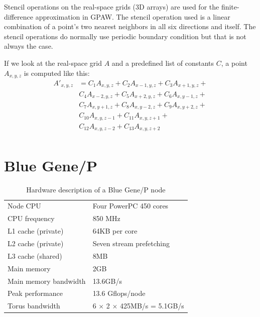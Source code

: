 \documentclass[preprint,3p,times,twocolumn]{elsarticle}
\begin{document}
Stencil operations on the real-space grids (3D arrays) are used for the finite-difference approximation in GPAW. The stencil operation used is a linear combination of a point's two nearest neighbors in all six directions and itself. 
The stencil operations do normally use periodic boundary condition but that is not always the case.

If we look at the real-space grid $A$ and a predefined list of constants $C$, a point $A_{x,y,z}$ is computed like this:
\begin{displaymath}
\begin{array}{ll}
A'_{x,y,z} &= C_1 A_{x,y,z} + C_2 A_{x-1,y,z} + C_3 A_{x+1,y,z} +\\
           &  C_4 A_{x-2,y,z} + C_5 A_{x+2,y,z} + C_6 A_{x,y-1,z} +\\
           &  C_7 A_{x,y+1,z} + C_8 A_{x,y-2,z} + C_9 A_{x,y+2,z} +\\
           &  C_{10} A_{x,y,z-1} + C_{11} A_{x,y,z+1} +\\
           &  C_{12} A_{x,y,z-2} + C_{13} A_{x,y,z+2}\\
\end{array}
\end{displaymath}

\section{Blue Gene/P}\label{sec:gpaw}
%
\begin{table}
\caption{Hardware description of a Blue Gene/P node}
\label{tab:bgp}
\centering
\begin{footnotesize}
\begin{tabular}{l l}
\hline
Node CPU & Four PowerPC 450 cores\\
CPU frequency & 850 MHz\\
L1 cache (private) & 64KB per core\\
L2 cache (private) & Seven stream pre\-fetching\\
L3 cache (shared) & 8MB\\
Main memory & 2GB\\
Main memory bandwidth & 13.6GB/s\\
Peak performance & 13.6 Gflops/node\\
Torus bandwidth & 6 $\times$ 2 $\times$ 425MB/s = 5.1GB/s\\
\hline
\end{tabular}
\end{footnotesize}
\end{table}
\end{document}
